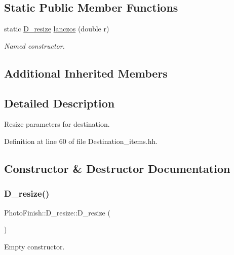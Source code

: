 \subsection*{Static Public Member Functions}
\begin{DoxyCompactItemize}
\item 
static \hyperlink{class_photo_finish_1_1_d__resize}{D\+\_\+resize} \hyperlink{class_photo_finish_1_1_d__resize_ac0476a607137a6a608c856f8393bd9bb}{lanczos} (double r)
\begin{DoxyCompactList}\small\item\em Named constructor. \end{DoxyCompactList}\end{DoxyCompactItemize}
\subsection*{Additional Inherited Members}


\subsection{Detailed Description}
Resize parameters for destination. 

Definition at line 60 of file Destination\+\_\+items.\+hh.



\subsection{Constructor \& Destructor Documentation}
\mbox{\label{class_photo_finish_1_1_d__resize_a105b90f42117f04e6ad834efb1530516}} 
\subsubsection{\texorpdfstring{D\+\_\+resize()}{D\_resize()}}
{\footnotesize\ttfamily Photo\+Finish\+::\+D\+\_\+resize\+::\+D\+\_\+resize (\begin{DoxyParamCaption}{ }\end{DoxyParamCaption})}



Empty constructor. 



